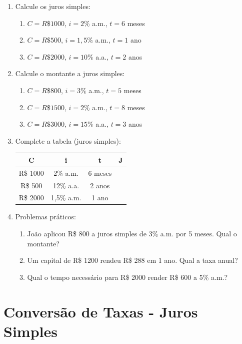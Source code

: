 \documentclass[11pt]{article}
\begin{document}
\begin{multicols}{2}
\begin{enumerate}[leftmargin=*]

\item Calcule os juros simples:
\begin{enumerate}[label=\alph*)]
\item $C = R\$ 1000$, $i = 2\%$ a.m., $t = 6$ meses
\item $C = R\$ 500$, $i = 1,5\%$ a.m., $t = 1$ ano
\item $C = R\$ 2000$, $i = 10\%$ a.a., $t = 2$ anos
\end{enumerate}

\item Calcule o montante a juros simples:
\begin{enumerate}[label=\alph*)]
\item $C = R\$ 800$, $i = 3\%$ a.m., $t = 5$ meses
\item $C = R\$ 1500$, $i = 2\%$ a.m., $t = 8$ meses
\item $C = R\$ 3000$, $i = 15\%$ a.a., $t = 3$ anos
\end{enumerate}

\item Complete a tabela (juros simples):
\begin{center}
\begin{tabular}{|c|c|c|c|}
\hline
\textbf{C} & \textbf{i} & \textbf{t} & \textbf{J} \\
\hline
R\$ 1000 & 2\% a.m. & 6 meses & \\
\hline
R\$ 500 & 12\% a.a. & 2 anos & \\
\hline
R\$ 2000 & 1,5\% a.m. & 1 ano & \\
\hline
\end{tabular}
\end{center}

\item Problemas práticos:
\begin{enumerate}[label=\alph*)]
\item João aplicou R\$ 800 a juros simples de 3\% a.m. por 5 meses. Qual o montante?
\item Um capital de R\$ 1200 rendeu R\$ 288 em 1 ano. Qual a taxa anual?
\item Qual o tempo necessário para R\$ 2000 render R\$ 600 a 5\% a.m.?
\end{enumerate}

\end{enumerate}

\section*{Conversão de Taxas - Juros Simples}


\end{multicols}
\end{document}
